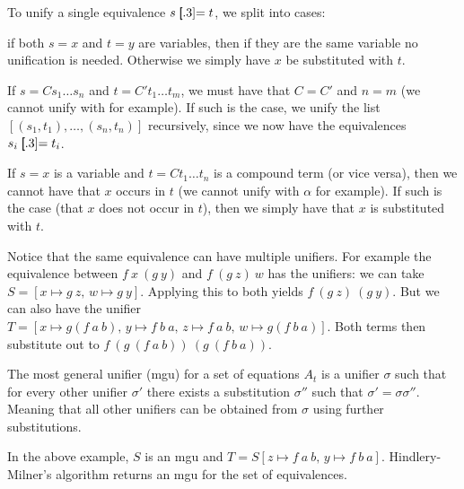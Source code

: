 To unify a single equivalence $s\eq t$, we split into cases:
\benum
    \item if both $s=x$ and $t=y$ are variables, then if they are the same variable no unification is needed.
    Otherwise we simply have $x$ be substituted with $t$.
    \item If $s=Cs_1\dots s_n$ and $t=C't_1\dots t_m$, we must have that $C=C'$ and $n=m$ (we cannot unify  with  for example).
    If such is the case, we unify the list $[(s_1,t_1),\dots,(s_n,t_n)]$ recursively, since we now have the equivalences $s_i\eq t_i$.
    \item If $s=x$ is a variable and $t=Ct_1\dots t_n$ is a compound term (or vice versa), then we cannot have that $x$ occurs in $t$ (we cannot unify  with $\alpha$ for example).
    If such is the case (that $x$ does not occur in $t$), then we simply have that $x$ is substituted with $t$.
\eenum

Notice that the same equivalence can have multiple unifiers.
For example the equivalence between $f\ x\ (g\ y)$ and $f\ (g\ z)\ w$ has the unifiers: we can take $S=[x\mapsto g\ z,\, w\mapsto g\ y]$.
Applying this to both yields $f\ (g\ z)\ (g\ y)$.
But we can also have the unifier $T=[x\mapsto g(f\ a\ b),\, y\mapsto f\ b\ a,\, z\mapsto f\ a\ b,\, w\mapsto g(f\ b\ a)]$.
Both terms then substitute out to $f\ (g\ (f\ a\ b))\ (g\ (f\ b\ a))$.

\bdefn

    The {\emphcolor most general unifier} (mgu) for a set of equations $A_t$ is a unifier $\sigma$ such that for every other unifier $\sigma'$ there exists a substitution $\sigma''$ such that
    $\sigma'=\sigma\sigma''$.
    Meaning that all other unifiers can be obtained from $\sigma$ using further substitutions.

\edefn

In the above example, $S$ is an mgu and $T=S[z\mapsto f\ a\ b,\,y\mapsto f\ b\ a]$.
Hindlery-Milner's algorithm returns an mgu for the set of equivalences.

